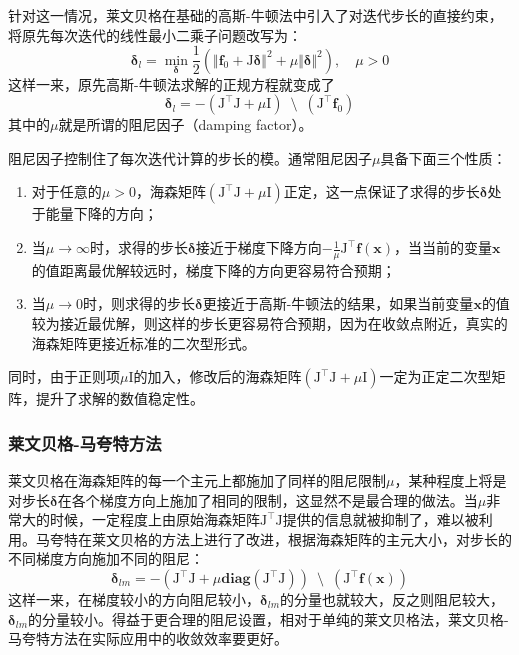 针对这一情况，莱文贝格在基础的高斯-牛顿法中引入了对迭代步长的直接约束，将原先每次迭代的线性最小二乘子问题改写为：
\begin{equation}
    \bm{\delta}_{l} =
        \mathop{\min}_{\bm{\delta}} \frac{1}{2}
        \left(
            \Vert \mathbf{f}_0 + \mathrm{J}\bm{\delta} \Vert^2 +
            \mu \Vert \bm{\delta} \Vert^2
        \right), \quad \mu > 0
\end{equation}
这样一来，原先高斯-牛顿法求解的正规方程就变成了
\begin{equation}
    \bm{\delta}_l =
        -\left( \mathrm{J}^\top\mathrm{J}+\mu\mathrm{I} \right)
        \enspace\setminus\enspace
        \left( \mathrm{J}^\top\mathbf{f}_0 \right)
    \label{eq:levenberg}
\end{equation}
其中的$\mu$就是所谓的阻尼因子（damping factor）。

阻尼因子控制住了每次迭代计算的步长的模。通常阻尼因子$\mu$具备下面三个性质\citep{tingleff2004methods}：
\begin{enumerate}
    \item 对于任意的$\mu>0$，海森矩阵$(\mathrm{J}^\top\mathrm{J}+\mu\mathrm{I})$正定，这一点保证了求得的步长$\bm{\delta}$处于能量下降的方向；
    \item 当$\mu\to\infty$时，求得的步长$\bm{\delta}$接近于梯度下降方向$-\frac{1}{\mu}\mathrm{J}^\top\mathbf{f}(\bm{x})$，当当前的变量$\bm{x}$ 的值距离最优解较远时，梯度下降的方向更容易符合预期；
    \item 当$\mu\to0$时，则求得的步长$\bm{\delta}$更接近于高斯-牛顿法的结果，如果当前变量$\bm{x}$的值较为接近最优解，则这样的步长更容易符合预期，因为在收敛点附近，真实的海森矩阵更接近标准的二次型形式。
\end{enumerate}
同时，由于正则项$\mu\mathrm{I}$的加入，修改后的海森矩阵$(\mathrm{J}^\top\mathrm{J}+\mu\mathrm{I})$一定为正定二次型矩阵，提升了求解的数值稳定性。

\subsubsection*{莱文贝格-马夸特方法}

莱文贝格在海森矩阵的每一个主元上都施加了同样的阻尼限制$\mu$，某种程度上将是对步长$\bm{\delta}$在各个梯度方向上施加了相同的限制，这显然不是最合理的做法。当$\mu$非常大的时候，一定程度上由原始海森矩阵$\mathrm{J}^\top\mathrm{J}$提供的信息就被抑制了，难以被利用。马夸特在莱文贝格的方法上进行了改进，根据海森矩阵的主元大小，对步长的不同梯度方向施加不同的阻尼：
\begin{equation}
    \bm{\delta}_{lm} =
        -\left( \mathrm{J}^\top\mathrm{J}+\mu\mathbf{diag}(\mathrm{J}^\top\mathrm{J}) \right)
        \enspace\setminus\enspace
        \left( \mathrm{J}^\top \mathbf{f}(\bm{x}) \right)
\end{equation}
这样一来，在梯度较小的方向阻尼较小，$\bm{\delta}_{lm}$的分量也就较大，反之则阻尼较大，$\bm{\delta}_{lm}$的分量较小。得益于更合理的阻尼设置，相对于单纯的莱文贝格法，莱文贝格-马夸特方法在实际应用中的收敛效率要更好。

